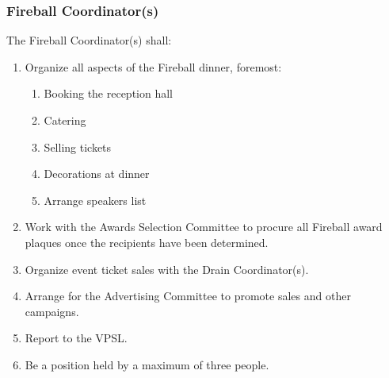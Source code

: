 
\subsubsection{Fireball Coordinator(s)}
\label{fireball-coordinators}
The Fireball Coordinator(s) shall:

\begin{enumerate}
 \item
  Organize all aspects of the Fireball dinner, foremost:

  \begin{enumerate}
   \item
    Booking the reception hall
   \item
    Catering
   \item
    Selling tickets
   \item
    Decorations at dinner
   \item
    Arrange speakers list
  \end{enumerate}
 \item
  Work with the Awards Selection Committee to procure all Fireball award plaques once the recipients have been determined.
 \item
  Organize event ticket sales with the Drain Coordinator(s).
 \item
  Arrange for the Advertising Committee to promote sales and other campaigns.
 \item
  Report to the VPSL.
 \item
  Be a position held by a maximum of three people.

\end{enumerate}
